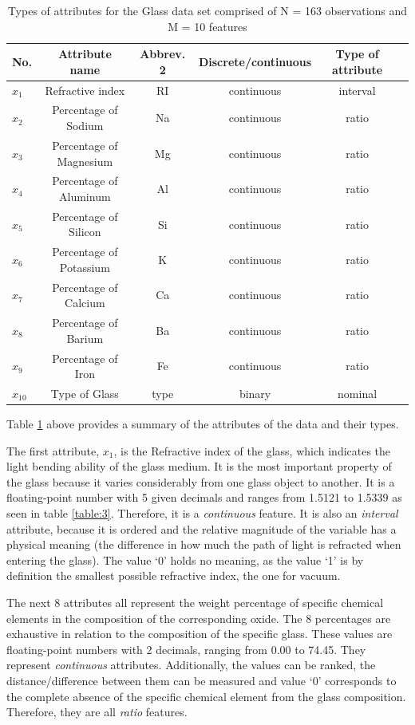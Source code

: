 \documentclass[12pt]{article}
\begin{document}
\begin{table}[H]
\begin{tabular}{|l|c|c|c|c|c|}
\hline
No. & Attribute name & Abbrev. 2 & Discrete/continuous & Type of attribute \\ \hline
$x_1$ & Refractive index & RI & continuous & interval \\ 
$x_2$ & Percentage of Sodium & Na & continuous & ratio \\ 
$x_3$ & Percentage of Magnesium & Mg & continuous & ratio \\ 
$x_4$ & Percentage of Aluminum & Al & continuous & ratio \\ 
$x_5$ & Percentage of Silicon & Si & continuous & ratio \\ 
$x_6$ & Percentage of Potassium & K & continuous & ratio \\ 
$x_7$ & Percentage of Calcium & Ca & continuous & ratio \\ 
$x_8$ & Percentage of Barium & Ba & continuous & ratio \\ 
$x_9$ & Percentage of Iron & Fe & continuous & ratio \\ \hline
$x_{10}$ & Type of Glass & type & binary & nominal \\ \hline
\end{tabular}
\caption{Types of attributes for the Glass data set comprised of N = 163 observations and M = 10 features}
\label{table:2}
\end{table}
Table \ref{table:2} above provides a summary of the attributes of the data and their types.

The first attribute, $ x_{1} $, is the Refractive index of the glass, which indicates the light bending ability of the glass medium. It is the most important property of the glass because it varies considerably from one glass object to another\cite{rule_induction_article}. It is a floating-point number with 5 given decimals and ranges from 1.5121 to 1.5339 as seen in table \ref{table:3}. Therefore, it is a \textit{continuous} feature. It is also an \textit{interval} attribute, because it is ordered and the relative magnitude of the variable has a physical meaning (the difference in how much the path of light is refracted when entering the glass). The value ‘0’ holds no meaning, as the value ‘1’ is by definition the smallest possible refractive index, the one for vacuum\cite{refractive_index}. 
 
The next 8 attributes all represent the weight percentage of specific chemical elements in the composition of the corresponding oxide. The 8 percentages are exhaustive in relation to the composition of the specific glass. These values are floating-point numbers with 2 decimals, ranging from 0.00 to 74.45. They represent \textit{continuous} attributes. Additionally, the values can be ranked, the distance/difference between them can be measured and value ‘0’ corresponds to the complete absence of the specific chemical element from the glass composition. Therefore, they are all \textit{ratio} features.
\end{document}
